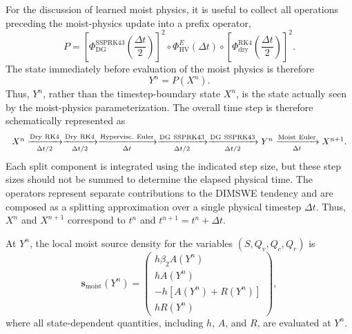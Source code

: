 \documentclass[12pt]{article}
\begin{document}
For the discussion of learned moist physics, it is useful to collect all operations preceding the moist-physics update into a prefix operator,
\begin{equation}
	P
	=
	\left[
	\Phi_{\mathrm{DG}}^{\mathrm{SSPRK43}}
	\left(\frac{\Delta t}{2}\right)
	\right]^2
	\circ
	\Phi_{\mathrm{HV}}^{E}(\Delta t)
	\circ
	\left[
	\Phi_{\mathrm{dry}}^{\mathrm{RK4}}
	\left(\frac{\Delta t}{2}\right)
	\right]^2.
	\label{eq:prefix_operator}
\end{equation}
The state immediately before evaluation of the moist physics is therefore
\begin{equation}
	Y^n=P(X^n).
	\label{eq:postprefix_state}
\end{equation}
Thus, $Y^n$, rather than the timestep-boundary state $X^n$, is the state actually seen by the moist-physics parameterization. The overall time step is therefore schematically represented as
\begin{equation}
	\resizebox{\textwidth}{!}{$
		X^n
		\xrightarrow[\Delta t/2]{\mathrm{Dry\ RK4}}
		\xrightarrow[\Delta t/2]{\mathrm{Dry\ RK4}}
		\xrightarrow[\Delta t]{\mathrm{Hypervisc.\ Euler}}
		\xrightarrow[\Delta t/2]{\mathrm{DG\ SSPRK43}}
		\xrightarrow[\Delta t/2]{\mathrm{DG\ SSPRK43}}
		Y^n
		\xrightarrow[\Delta t]{\mathrm{Moist\ Euler}}
		X^{n+1}
		$}.
	\label{eq:timestep_schematic}
\end{equation}
Each split component is integrated using the indicated step size, but these step sizes should not be summed to determine the elapsed physical time. The operators represent separate contributions to the DIMSWE tendency and are composed as a splitting approximation over a single physical timestep $\Delta t$. Thus, $X^n$ and $X^{n+1}$ correspond to $t^n$ and $t^{n+1}=t^n+\Delta t$.

At $Y^n$, the local moist source density for the variables
$(S,Q_v,Q_c,Q_r)$ is
\begin{equation}
	\mathbf{s}_{\mathrm{moist}}(Y^n)
	=
	\begin{pmatrix}
		h\beta_2 A(Y^n)\\
		hA(Y^n)\\
		-h\left[A(Y^n)+R(Y^n)\right]\\
		hR(Y^n)
	\end{pmatrix},
	\label{eq:local_moist_source}
\end{equation}
where all state-dependent quantities, including $h$, $A$, and $R$, are evaluated at $Y^n$. 
\end{document}

